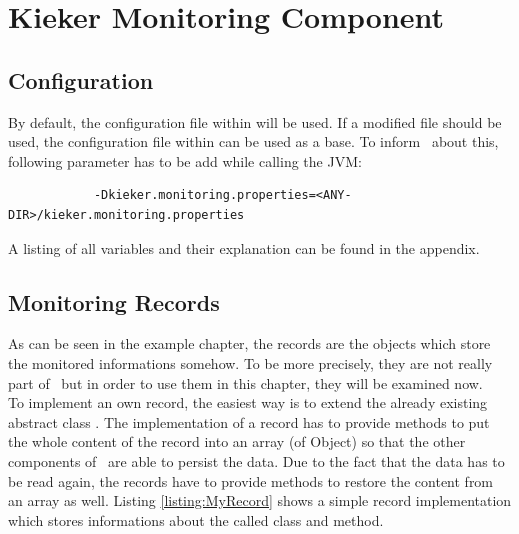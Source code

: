 % 


\chapter{Kieker Monitoring Component}\label{chap:componentsMonitoring}


	\section{Configuration}

		 By default, the configuration file within \dir{\mainJar} will be used. If a modified file should be used, the configuration file within  can be used as a base. To inform \Kieker\  about this, following parameter has to be add while calling the JVM:

		\setBashListing
		\begin{lstlisting} 
			-Dkieker.monitoring.properties=<ANY-DIR>/kieker.monitoring.properties      
		\end{lstlisting}

		A listing of all variables and their explanation can be found in the
		appendix.


	\section{Monitoring Records}\label{sec:componentsMonitoring:monitoringRecords}

		As can be seen in the example chapter, the records are the objects which store the monitored informations somehow. To be more precisely, they are not really part of \KiekerMonitoringPart\, but in order to use them in this chapter, they will be examined now.\\ To implement an own record, the easiest way is to extend the already existing abstract class . The implementation of a record has to provide methods to put the whole content of the record into an array (of Object) so that the other components of \Kieker\  are able to persist the data. Due to the fact that the data has to be read again, the records have to provide methods to restore the content from an array as well. Listing \ref{listing:MyRecord} shows a simple record implementation which stores informations about the called class and method.


